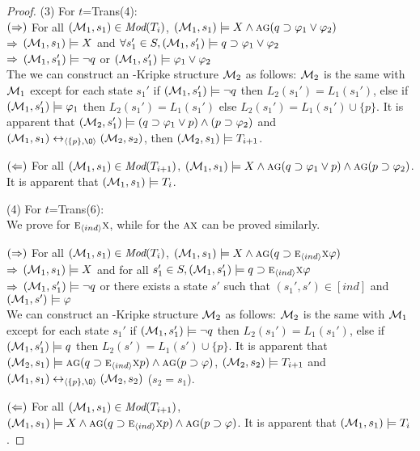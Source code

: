 \documentclass[letterpaper]{article}
\begin{document}
\begin{proof}
(3) For $t$=Trans(4):\\
$(\Rightarrow)$ For all $({\cal M}_1,s_1) \in \textit{Mod}(T_i)$, \ie $({\cal M}_1,s_1) \models X \wedge \textsc{a}\textsc{g} (q \supset \varphi_1 \vee \varphi_2)$ \\
$\Rightarrow$ $({\cal M}_1,s_1) \models X$ and $\forall s_1'\in S, ({\cal M}_1,s_1') \models q \supset \varphi_1 \vee \varphi_2$\\
$\Rightarrow$ $({\cal M}_1,s_1') \models \neg q$ or $({\cal M}_1,s_1') \models \varphi_1 \vee \varphi_2$\\
The we can construct an \Ind-Kripke structure ${\cal M}_2$ as follows: ${\cal M}_2$ is the same with ${\cal M}_1$ except for each state $s_1'$ if $({\cal M}_1,s_1') \models \neg q$ then $L_2(s_1')= L_1(s_1')$, else if $({\cal M}_1,s_1') \models \varphi_1$ then $L_2(s_1')= L_1(s_1')$ else $L_2(s_1') = L_1(s_1') \cup \{p\}$. It is apparent that $({\cal M}_2,s_1') \models (q\supset \varphi_1 \vee p) \wedge (p \supset \varphi_2)$ and $(\Hm_1, s_1) \lrto_{\tuple{\{p\}, {\O}}} (\Hm_2, s_2)$, then $({\cal M}_2,s_1) \models T_{i+1}$.

$(\Leftarrow)$ For all $({\cal M}_1, s_1) \in \textit{Mod}(T_{i+1})$, \ie $({\cal M}_1,s_1) \models X \wedge \textsc{a}\textsc{g} (q\supset \varphi_1 \vee p) \wedge \textsc{a}\textsc{g}(p \supset \varphi_2)$. It is apparent that $({\cal M}_1, s_1) \models T_i$.


(4) For $t$=Trans(6):\\
We prove for $\textsc{e}_{{\langle{ind}\rangle}} \textsc{x}$, while for the $\textsc{a} \textsc{x}$ can be proved similarly.

$(\Rightarrow)$ For all $({\cal M}_1,s_1) \in \textit{Mod}(T_i)$, \ie $({\cal M}_1,s_1) \models X \wedge \textsc{a}\textsc{g}(q \supset \textsc{e}_{{\langle{ind}\rangle}}\textsc{x} \varphi)$\\
$\Rightarrow$ $({\cal M}_1,s_1) \models X$ and for all $s_1'\in S, ({\cal M}_1,s_1') \models q \supset \textsc{e}_{{\langle{ind}\rangle}} \textsc{x} \varphi$\\
$\Rightarrow$ $({\cal M}_1,s_1') \models \neg q$ or there exists a state $s'$ such that $(s_1', s') \in [ind]$ and $({\cal M}_1,s') \models \varphi$ \\
We can construct an \Ind-Kripke structure ${\cal M}_2$ as follows: ${\cal M}_2$ is the same with ${\cal M}_1$ except for each state $s_1'$ if $({\cal M}_1,s_1') \models \neg q$ then $L_2(s_1')= L_1(s_1')$, else if $({\cal M}_1,s_1') \models q$ then $L_2(s') = L_1(s') \cup \{p\}$. It is apparent that $({\cal M}_2,s_1) \models \textsc{a}\textsc{g}(q\supset \textsc{e}_{{\langle{ind}\rangle}} \textsc{x} p) \wedge \textsc{a}\textsc{g}(p \supset \varphi)$, $({\cal M}_2,s_2) \models T_{i+1}$ and $(\Hm_1, s_1) \lrto_{\tuple{\{p\}, {\O}}} (\Hm_2, s_2)$ ($s_2=s_1$).

 $(\Leftarrow)$ For all $({\cal M}_1, s_1) \in \textit{Mod}(T_{i+1})$, \ie $({\cal M}_1,s_1) \models X \wedge \textsc{a}\textsc{g}(q\supset \textsc{e}_{{\langle{ind}\rangle}} \textsc{x} p) \wedge \textsc{a}\textsc{g}(p \supset \varphi)$. It is apparent that $({\cal M}_1, s_1) \models T_i$.

\end{proof}
\end{document}
